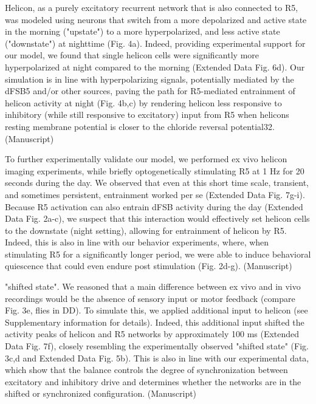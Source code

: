 Helicon, as a purely excitatory recurrent network
that is also connected to R5, was modeled using neurons that switch from a more depolarized
and active state in the morning ("upstate") to a more hyperpolarized, and less active state
("downstate") at nighttime (Fig. 4a). Indeed, providing experimental support for our model,
we found that single helicon cells were significantly more hyperpolarized at night compared
to the morning (Extended Data Fig. 6d). Our simulation is in line with hyperpolarizing signals,
potentially mediated by the dFSB5 and/or other sources, paving the path for R5-mediated
entrainment of helicon activity at night (Fig. 4b,c) by rendering helicon less responsive to
inhibitory (while still responsive to excitatory) input from R5 when helicons resting membrane
potential is closer to the chloride reversal potential32. 
\cite{raccugliaCoherentMultilevelNetwork2022} (Manuscript)

To further experimentally validate our model, we performed ex vivo helicon imaging
experiments, while briefly optogenetically stimulating R5 at 1 Hz for 20 seconds during the
day. We observed that even at this short time scale, transient, and sometimes persistent,
entrainment worked per se (Extended Data Fig. 7g-i). Because R5 activation can also entrain
dFSB activity during the day (Extended Data Fig. 2a-c), we suspect that this interaction would
effectively set helicon cells to the downstate (night setting), allowing for entrainment of
helicon by R5. Indeed, this is also in line with our behavior experiments, where, when
stimulating R5 for a significantly longer period, we were able to induce behavioral quiescence
that could even endure post stimulation (Fig. 2d-g).
\cite{raccugliaCoherentMultilevelNetwork2022} (Manuscript)

"shifted state". We
reasoned that a main difference between ex vivo and in vivo recordings would be the absence
of sensory input or motor feedback (compare Fig. 3e, flies in DD). To simulate this, we applied
additional input to helicon (see Supplementary information for details). Indeed, this
additional input shifted the activity peaks of helicon and R5 networks by approximately 100
ms (Extended Data Fig. 7f), closely resembling the experimentally observed "shifted state" (Fig.
3c,d and Extended Data Fig. 5b). This is also in line with our experimental data, which show
that the balance controls the degree of synchronization between excitatory and inhibitory
drive and determines whether the networks are in the shifted or synchronized configuration.
\cite{raccugliaCoherentMultilevelNetwork2022} (Manuscript)

